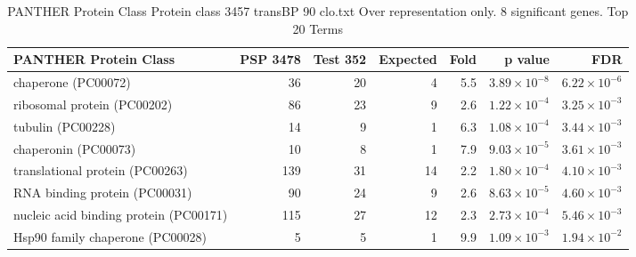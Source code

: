 \begin{table}[ht]
\centering
\begin{adjustbox}{width=\textwidth}
\begin{tabular}{lrrrrrr}
  \hline
PANTHER Protein Class & PSP 3478 & Test 352 & Expected & Fold & p value & FDR \\ 
  \hline
chaperone (PC00072) & 36 & 20 & 4 & 5.5 & $3.89 \times 10^{-8}$ & $6.22 \times 10^{-6}$ \\ 
  ribosomal protein (PC00202) & 86 & 23 & 9 & 2.6 & $1.22 \times 10^{-4}$ & $3.25 \times 10^{-3}$ \\ 
  tubulin (PC00228) & 14 & 9 & 1 & 6.3 & $1.08 \times 10^{-4}$ & $3.44 \times 10^{-3}$ \\ 
  chaperonin (PC00073) & 10 & 8 & 1 & 7.9 & $9.03 \times 10^{-5}$ & $3.61 \times 10^{-3}$ \\ 
  translational protein (PC00263) & 139 & 31 & 14 & 2.2 & $1.80 \times 10^{-4}$ & $4.10 \times 10^{-3}$ \\ 
  RNA binding protein (PC00031) & 90 & 24 & 9 & 2.6 & $8.63 \times 10^{-5}$ & $4.60 \times 10^{-3}$ \\ 
  nucleic acid binding protein (PC00171) & 115 & 27 & 12 & 2.3 & $2.73 \times 10^{-4}$ & $5.46 \times 10^{-3}$ \\ 
  Hsp90 family chaperone (PC00028) & 5 & 5 & 1 & 9.9 & $1.09 \times 10^{-3}$ & $1.94 \times 10^{-2}$ \\ 
   \hline
\end{tabular}
\end{adjustbox}
\caption{PANTHER Protein Class Protein class 3457 transBP 90 clo.txt Over representation only. 8 significant genes. Top 20 Terms} 
\label{tab:PANTHER Protein Class Protein class 3457 transBP 90 clo.txt Over representation only. 8 significant genes. Top 20 Terms}
\end{table}




